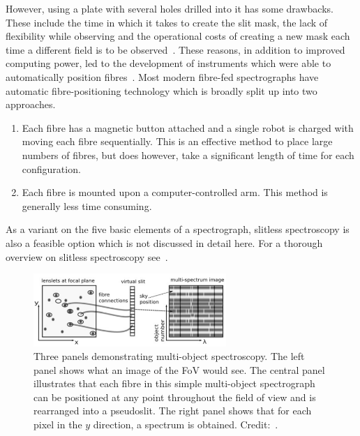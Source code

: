 However, using a plate with several holes drilled into it has some drawbacks.
These include the time in which it takes to create the slit mask, the lack of flexibility while observing and the operational costs of creating a new mask each time a different field is to be observed~\citep{1986SPIE..627..118P}.
These reasons, in addition to improved computing power, led to the development of instruments which were able to automatically position fibres~\citep{1982SPIE..331..289T}.
Most modern fibre-fed spectrographs have automatic fibre-positioning technology which is broadly split up into two approaches.

\begin{enumerate}
    \item Each fibre has a magnetic button attached and a single robot is charged with moving each fibre sequentially.
    This is an effective method to place large numbers of fibres, but does however, take a significant length of time for each configuration.
    \item Each fibre is mounted upon a computer-controlled arm.
    This method is generally less time consuming.
\end{enumerate}

As a variant on the five basic elements of a spectrograph, slitless spectroscopy is also a feasible option which is not discussed in detail here.
For a thorough overview on slitless spectroscopy see~\citet{2014PhDT.........C}.

\begin{figure}
 \centering
 \includegraphics[width=0.65\textwidth]{kmos/Lawrence-multi-object}
 \caption[Multi-object Spectroscopy]{Three panels demonstrating multi-object spectroscopy.
 The left panel shows what an image of the FoV would see.
 The central panel illustrates that each fibre in this simple multi-object spectrograph can be positioned at any point throughout the field of view and is rearranged into a pseudoslit.
 The right panel shows that for each pixel in the $y$ direction, a spectrum is obtained.
 Credit:~\cite{2014amcg.book.....L}.
 \label{fig:multi-obj}}
\end{figure}

